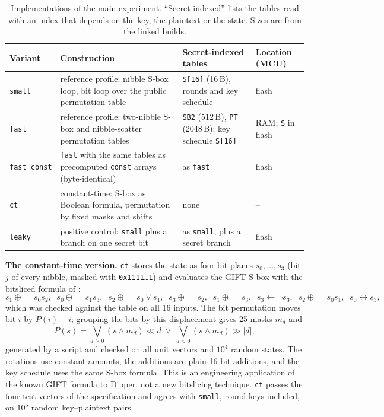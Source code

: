 \documentclass[11pt, a4paper, twoside, reqno]{article}
\newcommand{\tsm}{\texttt{small}}
\newcommand{\tfa}{\texttt{fast}}
\newcommand{\tfc}{\texttt{fast\_const}}
\newcommand{\tct}{\texttt{ct}}
\newcommand{\tlk}{\texttt{leaky}}
\begin{document}
\begin{table}[!htbp]
\centering
\caption{Implementations of the main experiment. ``Secret-indexed'' lists the tables read with an index that depends on the key, the plaintext or the state. Sizes are from the linked builds.}
\label{tab:variants}
\small
\begin{tabular}{lp{5.2cm}p{4.8cm}l}
\hline
Variant & Construction & Secret-indexed tables & Location (MCU)\\
\hline
\tsm{} & reference profile: nibble S-box loop, bit loop over the public permutation table & \texttt{S[16]} (16\,B), rounds and key schedule & flash\\
\tfa{} & reference profile: two-nibble S-box and nibble-scatter permutation tables & \texttt{SB2} (512\,B), \texttt{PT} (2048\,B); key schedule \texttt{S[16]} & RAM; \texttt{S} in flash\\
\tfc{} & \tfa{} with the same tables as precomputed \texttt{const} arrays (byte-identical) & as \tfa{} & flash\\
\tct{} & constant-time: S-box as Boolean formula, permutation by fixed masks and shifts & none & --\\
\tlk{} & positive control: \tsm{} plus a branch on one secret bit & as \tsm{}, plus a secret branch & flash\\
\hline
\end{tabular}
\end{table}

\textbf{The constant-time version.} \tct{} stores the state as four bit planes $s_0,\dots,s_3$ (bit $j$ of every nibble, masked with \texttt{0x1111\ldots1}) and evaluates the GIFT S-box with the bitsliced formula of \cite{banik2017}:
\begin{equation}
s_1 \mathrel{\oplus}= s_0 s_2,\;\; s_0 \mathrel{\oplus}= s_1 s_3,\;\; s_2 \mathrel{\oplus}= s_0 \vee s_1,\;\; s_3 \mathrel{\oplus}= s_2,\;\; s_1 \mathrel{\oplus}= s_3,\;\; s_3 \leftarrow \neg s_3,\;\; s_2 \mathrel{\oplus}= s_0 s_1,\;\; s_0 \leftrightarrow s_3,
\end{equation}
which was checked against the table on all 16 inputs. The bit permutation moves bit $i$ by $P(i)-i$; grouping the bits by this displacement gives 25 masks $m_d$ and
\begin{equation}
P(s)=\bigvee_{d\geq 0} (s \wedge m_d) \ll d \;\vee\; \bigvee_{d<0} (s \wedge m_d) \gg |d|,
\end{equation}
generated by a script and checked on all unit vectors and $10^4$ random states. The rotations use constant amounts, the additions are plain 16-bit additions, and the key schedule uses the same S-box formula. This is an engineering application of the known GIFT formula to Dipper, not a new bitslicing technique. \tct{} passes the four test vectors of the specification and agrees with \tsm{}, round keys included, on $10^5$ random key--plaintext pairs.
\end{document}
